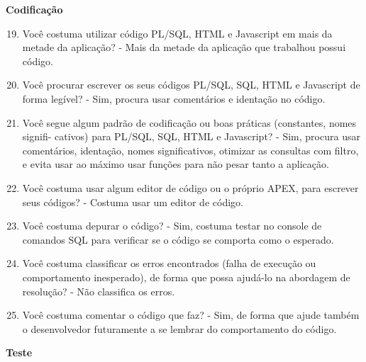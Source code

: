 \begin{anexosenv}
\textbf{Codificação}

\begin{enumerate}
\setcounter{enumi}{18}
\item Você costuma utilizar código PL/SQL, HTML e Javascript em mais da metade da
aplicação?\newline
- Mais da metade da aplicação que trabalhou possui código.
\item Você procurar escrever os seus códigos PL/SQL, SQL, HTML e Javascript de forma
legível?\newline
- Sim, procura usar comentários e identação no código.
\item Você segue algum padrão de codificação ou boas práticas (constantes, nomes signifi-
cativos) para PL/SQL, SQL, HTML e Javascript?\newline
- Sim, procura usar comentários, identação, nomes significativos, otimizar as consultas com filtro, e evita usar ao máximo usar funções para não pesar tanto a aplicação.
\item Você costuma usar algum editor de código ou o próprio APEX, para escrever seus
códigos?\newline
- Costuma usar um editor de código.
\item Você costuma depurar o código?\newline
- Sim, costuma testar no console de comandos SQL para verificar se o código se comporta como o esperado.
\item Você costuma classificar os erros encontrados (falha de execução ou comportamento
inesperado), de forma que possa ajudá-lo na abordagem de resolução?\newline
- Não classifica os erros.
\item Você costuma comentar o código que faz?\newline
- Sim, de forma que ajude também o desenvolvedor futuramente a se lembrar do comportamento do código.
\end{enumerate}

\textbf{Teste}


\end{anexosenv}
